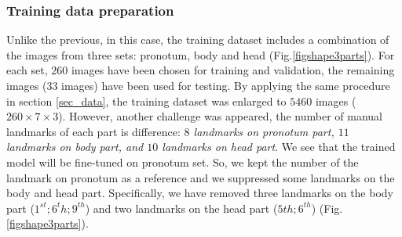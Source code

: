 \documentclass[10pt]{article}
\begin{document}
\subsubsection{Training data preparation}
Unlike the previous, in this case, the training dataset includes a combination of the images from three sets: pronotum, body and head (Fig.\ref{figshape3parts}). For each set, $260$ images have been chosen for training and validation, the remaining images ($33$ images) have been used for testing. By applying the same procedure in section \ref{sec_data}, the training dataset was enlarged to $5460$ images ($260 \times 7 \times 3$). However, another challenge was appeared, the number of manual landmarks of each part is difference: \textit{$8$ landmarks on pronotum part, $11$ landmarks on body part, and $10$ landmarks on head part}. We see that the trained model will be fine-tuned on pronotum set. So, we kept the number of the landmark on pronotum as a reference and we suppressed some landmarks on the body and head part. Specifically, we have removed three landmarks on the body part ($1^{st}; 6^{t}h; 9^{th}$) and two landmarks on the head part ($5{th}; 6^{th}$) (Fig.\ref{figshape3parts}).
\end{document}
